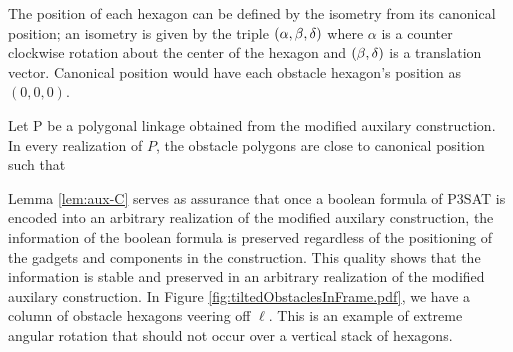 The position of each hexagon can be defined by the isometry from its canonical position; an isometry is given by the triple $\left( \alpha, \beta, \delta \right)$ where $\alpha$ is a counter clockwise rotation about the center of the hexagon and $\left( \beta,\delta \right)$ is a translation vector.%
Canonical position would have each obstacle hexagon's position as $(0,0,0)$.
\begin{lem}\label{lem:aux-C}
Let P be a polygonal linkage obtained from the modified auxilary construction.  
In every realization of $P$, the obstacle polygons are close to canonical position such that 
\end{lem}
Lemma \ref{lem:aux-C} serves as assurance that once a boolean formula of P3SAT is encoded into an arbitrary realization of the modified auxilary construction, the information of the boolean formula is preserved regardless of the positioning of the gadgets and components in the construction.
This quality shows that the information is stable and preserved in an arbitrary realization of the modified auxilary construction.
In Figure \ref{fig:tiltedObstaclesInFrame.pdf}, we have a column of obstacle hexagons veering off $\ell$.
This is an example of extreme angular rotation that should not occur over a vertical stack of hexagons.

